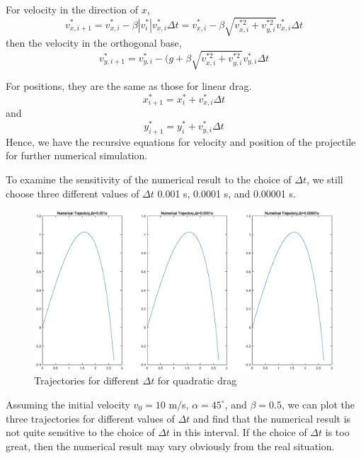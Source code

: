 \documentclass[12pt]{report}
\begin{document}
For velocity in the direction of $x$,
\begin{equation}
    v_{x,i+1}^*=v_{x,i}^*-\beta\left|v_i^*\right| v_{x,i}^*\Delta t=v_{x,i}^*-\beta\sqrt{v_{x,i}^{*2}+v_{y,i}^{*2}} v_{x,i}^*\Delta t
\end{equation}
then the velocity in the orthogonal base,
\begin{equation}
    v_{y,i+1}^*=v_{y,i}^*-(g+\beta\sqrt{v_{x,i}^{*2}+v_{y,i}^{*2}} v_{y,i}^*\Delta t
\end{equation}

For positions, they are the same as those for linear drag.
\begin{equation}
    x_{i+1}^*=x_i^*+v_{x,i}^*\Delta t
\end{equation}
and
\begin{equation}
    y_{i+1}^*=y_i^*+v_{y,i}^*\Delta t
\end{equation}
Hence, we have the recursive equations for velocity and position of the projectile for further numerical simulation.

To examine the sensitivity of the numerical result to the choice of $\Delta t$, we still choose three different values of $\Delta t$ 0.001 s, 0.0001 s, and 0.00001 s.
\begin{figure}[H]
    \centering
    \includegraphics[width=1\linewidth]{2-2-1.eps}
    \caption{Trajectories for different $\Delta t$ for quadratic drag}
\end{figure}
Assuming the initial velocity $v_0=10$ m/s, $\alpha=45^\circ$, and $\beta=0.5$, we can plot the three trajectories for different values of $\Delta t$ and find that the numerical result is not quite sensitive to the choice of $\Delta t$ in this interval. If the choice of $\Delta t$ is too great, then the numerical result may vary obviously from the real situation.
\end{document}
